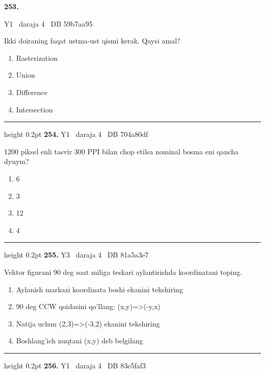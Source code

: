 \documentclass[10pt,a4paper,oneside]{article}
\begin{document}
\hypertarget{q253}{\textbf{\color{ink}253.}}  {\color{muted}\scriptsize Y1 \textbullet\ daraja 4 \textbullet\ DB 59b7aa95}
\par
Ikki doiraning faqat ustma-ust qismi kerak. Qaysi amal?
\begin{enumerate}[label=\Alph*),leftmargin=9mm]
\item Rasterization
\item Union
\item Difference
\item Intersection
\end{enumerate}
\vspace{2mm}\hrule height 0.2pt \vspace{4mm}
\hypertarget{q254}{\textbf{\color{ink}254.}}  {\color{muted}\scriptsize Y1 \textbullet\ daraja 4 \textbullet\ DB 704a80df}
\par
1200 piksel enli tasvir 300 PPI bilan chop etilsa nominal bosma eni qancha dyuym?
\begin{enumerate}[label=\Alph*),leftmargin=9mm]
\item 6
\item 3
\item 12
\item 4
\end{enumerate}
\vspace{2mm}\hrule height 0.2pt \vspace{4mm}
\hypertarget{q255}{\textbf{\color{ink}255.}}  {\color{muted}\scriptsize Y3 \textbullet\ daraja 4 \textbullet\ DB 81a5a3e7}
\par
Vektor figurani 90 deg  soat miliga teskari aylantirishda koordinatani toping.
\begin{enumerate}[label=\Alph*),leftmargin=9mm]
\item Aylanish markazi koordinata boshi ekanini tekshiring
\item 90 deg  CCW qoidasini qo'llang: (x,y)=\textgreater{}(-y,x)
\item Natija uchun (2,3)=\textgreater{}(-3,2) ekanini tekshiring
\item Boshlang'ich nuqtani (x,y) deb belgilang
\end{enumerate}
\vspace{2mm}\hrule height 0.2pt \vspace{4mm}
\hypertarget{q256}{\textbf{\color{ink}256.}}  {\color{muted}\scriptsize Y1 \textbullet\ daraja 4 \textbullet\ DB 83e5faf3}
\par
\end{document}
